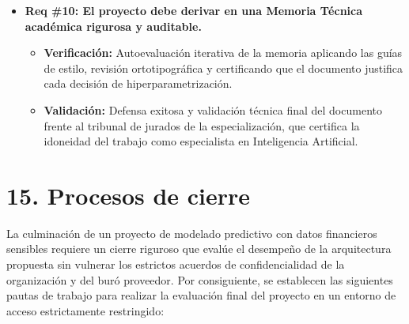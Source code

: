 \documentclass[
11pt, %
]{charter}
\begin{document}
\begin{itemize}
    \item \textbf{Req \#10: El proyecto debe derivar en una Memoria Técnica académica rigurosa y auditable.}
    \begin{itemize}
        \item \textbf{Verificación:} Autoevaluación iterativa de la memoria aplicando las guías de estilo, revisión ortotipográfica y certificando que el documento justifica cada decisión de hiperparametrización.
        \item \textbf{Validación:} Defensa exitosa y validación técnica final del documento frente al tribunal de jurados de la especialización, que certifica la idoneidad del trabajo como especialista en Inteligencia Artificial.
    \end{itemize}

\end{itemize}


\section{15. Procesos de cierre}
\label{sec:cierre}

La culminación de un proyecto de modelado predictivo con datos financieros sensibles requiere un cierre riguroso que evalúe el desempeño de la arquitectura propuesta sin vulnerar los estrictos acuerdos de confidencialidad de la organización y del buró proveedor. Por consiguiente, se establecen las siguientes pautas de trabajo para realizar la evaluación final del proyecto en un entorno de acceso estrictamente restringido:
\end{document}
